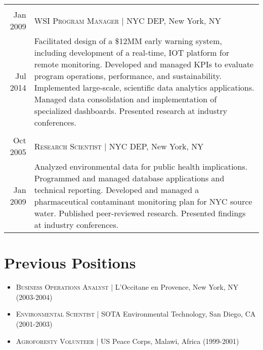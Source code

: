 \documentclass[a4paper,10pt]{article}
\begin{document}
\begin{tabular}{r|p{13cm}}
\\\multicolumn{2}{c}{} \\{Jan 2009} & \textsc{WSI Program Manager} | NYC DEP, New York, NY \\{Jul 2014}&\footnotesize{ Facilitated design of a \$12MM early warning system, including development of a real-time, IOT platform for remote monitoring. Developed and managed KPIs to evaluate program operations, performance, and sustainability. Implemented large-scale, scientific data analytics applications. Managed data consolidation and implementation of specialized dashboards. Presented research at industry conferences.}\\\multicolumn{2}{c}{} \\{Oct 2005} & \textsc{Research Scientist} | NYC DEP, New York, NY \\{Jan 2009}&\footnotesize{Analyzed environmental data for public health implications. Programmed and managed database applications and technical reporting. Developed and managed a pharmaceutical contaminant monitoring plan for NYC source water. Published peer-reviewed research. Presented findings at industry conferences.}
\end{tabular}


\section{Previous Positions}
 \begin{itemize}
		\item\textsc{Business Operations Analyst} | L'Occitane en Provence, New York, NY (2003-2004)
		\item\textsc{Environmental Scientist} | SOTA Environmental Technology, San Diego, CA (2001-2003)
		\item\textsc{Agroforesty Volunteer} | US Peace Corps, Malawi, Africa (1999-2001)
	\end{itemize}\vspace{-0.5em}


\end{document}
